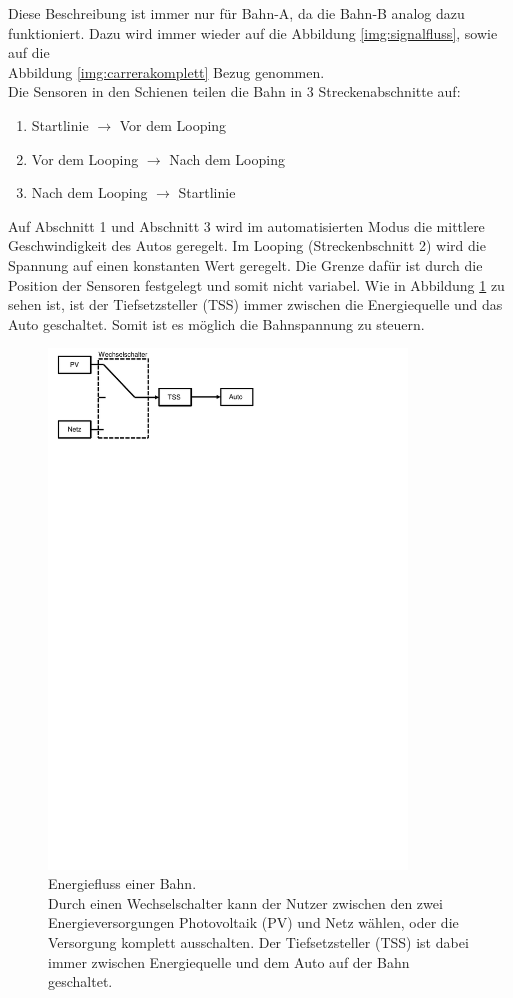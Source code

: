 \documentclass[a4paper, 11pt]{report}
\begin{document}
	Diese Beschreibung ist immer nur für Bahn-A, da die
	Bahn-B analog dazu funktioniert. Dazu wird immer wieder auf die Abbildung \ref{img:signalfluss}, sowie auf die \\Abbildung
	\ref{img:carrerakomplett} Bezug genommen.\\
	Die Sensoren in den Schienen teilen die Bahn in 3 Streckenabschnitte auf:
	\begin{enumerate}
		\item Startlinie $\rightarrow$ Vor dem Looping
		\item Vor dem Looping $\rightarrow$ Nach dem Looping
		\item Nach dem Looping $\rightarrow$ Startlinie
	\end{enumerate}
	Auf Abschnitt 1 und Abschnitt 3 wird im automatisierten Modus die mittlere Geschwindigkeit des Autos geregelt.
	Im Looping (Streckenbschnitt 2) wird die Spannung auf einen konstanten Wert geregelt.
	Die Grenze dafür ist durch die Position der Sensoren festgelegt und somit nicht variabel.
Wie in Abbildung \ref{img:energiefluss} zu sehen ist, ist der Tiefsetzsteller (TSS) immer zwischen die Energiequelle und das Auto geschaltet. Somit ist es möglich die Bahnspannung zu steuern. 
	\begin{figure}[ht]
		\centering
		\includegraphics[width=0.85\textwidth]{rec/energiefluss.pdf}
		\caption[Energiefluss einer Bahn]{Energiefluss einer Bahn.\\Durch einen Wechselschalter kann der Nutzer zwischen den zwei Energieversorgungen 
			Photovoltaik (PV) und Netz wählen, oder die Versorgung komplett ausschalten. 
			Der Tiefsetzsteller (TSS) ist dabei immer zwischen Energiequelle und dem Auto auf der Bahn geschaltet.}
		\label{img:energiefluss}
	\end{figure}
\end{document}
